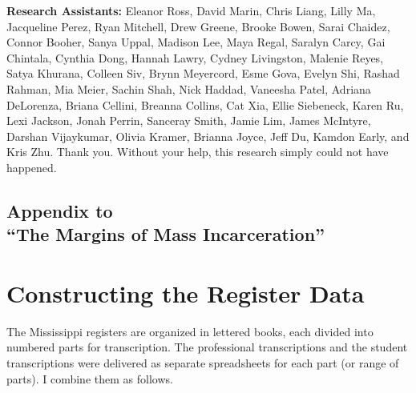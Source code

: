 \documentclass[12pt]{article}
\begin{document}
\vspace*{.6in}
\singlespacing
\textbf{Research Assistants:} Eleanor Ross, David Marin, Chris Liang, Lilly Ma, Jacqueline Perez, Ryan Mitchell, Drew Greene, Brooke Bowen, Sarai Chaidez, Connor Booher, Sanya Uppal, Madison Lee, Maya Regal, Saralyn Carcy, Gai Chintala, Cynthia Dong, Hannah Lawry, Cydney Livingston, Malenie Reyes, Satya Khurana, Colleen Siv, Brynn Meyercord, Esme Gova, Evelyn Shi, Rashad Rahman, Mia Meier, Sachin Shah, Nick Haddad, Vaneesha Patel, Adriana DeLorenza, Briana Cellini, Breanna Collins, Cat Xia, Ellie Siebeneck, Karen Ru, Lexi Jackson, Jonah Perrin, Sanceray Smith, Jamie Lim, James McIntyre, Darshan Vijaykumar, Olivia Kramer, Brianna Joyce, Jeff Du, Kamdon Early, and Kris Zhu.  Thank you.  Without your help, this research simply could not have happened.





\clearpage \newpage
\singlespacing









\clearpage \newpage
\appendix
\onehalfspacing
\setcounter{table}{0}
\renewcommand{\thetable}{A\arabic{table}}
\setcounter{figure}{0}
\renewcommand{\thefigure}{A\arabic{figure}}

\begin{center}
	\section*{\normalfont \LARGE Appendix to \\``The Margins of Mass Incarceration''}
\end{center}



\section{Constructing the Register Data}\label{appendix_data}

\noindent The Mississippi registers are organized in lettered books, each divided into numbered parts for transcription.  The professional transcriptions and the student transcriptions were delivered as separate spreadsheets for each part (or range of parts).  I combine them as follows.
\end{document}
